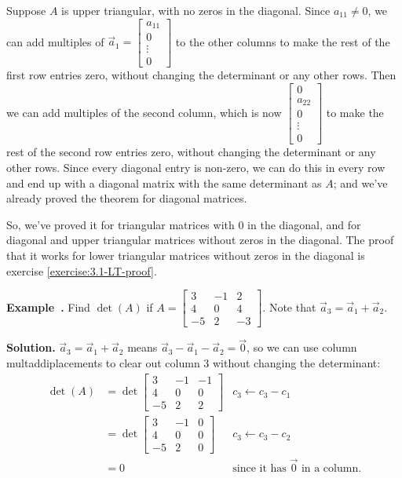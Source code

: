 \documentclass[11pt, letterpaper]{report}
\newenvironment{notes}{}{}
\newenvironment{book}{}{}
\newcounter{exercise}[section]
\newcounter{example}[section]
\newcommand{\example}{\refstepcounter{example}%
\par\noindent\textbf{Example~\theexample.} }
\newcounter{theorem}[chapter]
\begin{document}
\begin{book}
Suppose $A$ is upper triangular, with no zeros in the diagonal. Since $a_{11}\ne 0$, we can add multiples of $\vec{a}_1= \begin{bmatrix}
a_{11} \\ 0 \\ \vdots \\ 0
\end{bmatrix}$ to the other columns to make the rest of the first row entries zero, without changing the determinant or any other rows. Then we can add multiples of the second column, which is now $\begin{bmatrix}
0 \\ a_{22} \\ 0 \\ \vdots \\ 0
\end{bmatrix}$ to make the rest of the second row entries zero, without changing the determinant or any other rows. Since every diagonal entry is non-zero, we can do this in every row and end up with a diagonal matrix with the same determinant as $A$; and we've already proved the theorem for diagonal matrices.

So, we've proved it for triangular matrices with 0 in the diagonal, and for diagonal and upper triangular matrices without zeros in the diagonal. The proof that it works for lower triangular matrices without zeros in the diagonal is exercise \ref{exercise:3.1-LT-proof}. \blacksquare
\end{book}

\example Find $\det(A)$ if $A = \begin{bmatrix}
3 & -1 & 2 \\
4 & 0 & 4 \\
-5 & 2 & -3
\end{bmatrix}$. Note that $\vec{a}_{3}=\vec{a}_1+\vec{a}_2$.

\begin{notes}
\vfill
\end{notes}
\begin{book}
\textbf{Solution.} $\vec{a}_{3}=\vec{a}_1+\vec{a}_2$ means $\vec{a}_3-\vec{a}_1-\vec{a}_2=\vec{0}$, so we can use column multaddiplacements to clear out column 3 without changing the determinant:
\begin{align*}
\det(A) &= \det \begin{bmatrix}
3 & -1 & -1 \\
4 & 0 & 0 \\
-5 & 2 & 2
\end{bmatrix} &c_3\leftarrow c_3-c_1 \\
&= \det \begin{bmatrix}
3 & -1 & 0 \\
4 & 0 & 0 \\
-5 & 2 & 0
\end{bmatrix} &c_3\leftarrow c_3-c_2  \\
&= 0 &\text{since it has } \vec{0}\text{ in a column.}
\end{align*}
\blacksquare
\end{book}
\end{document}
